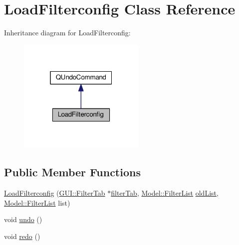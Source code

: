 \hypertarget{classUndoRedo_1_1LoadFilterconfig}{}\section{Load\+Filterconfig Class Reference}
\label{classUndoRedo_1_1LoadFilterconfig}


Inheritance diagram for Load\+Filterconfig\+:
\nopagebreak
\begin{figure}[H]
\begin{center}
\leavevmode
\includegraphics[width=172pt]{classUndoRedo_1_1LoadFilterconfig__inherit__graph}
\end{center}
\end{figure}
\subsection*{Public Member Functions}
\begin{DoxyCompactItemize}
\item 
\hyperlink{classUndoRedo_1_1LoadFilterconfig_a3bffa2e2bc6f8fc55e2e5c2615dad570}{Load\+Filterconfig} (\hyperlink{classGUI_1_1FilterTab}{G\+U\+I\+::\+Filter\+Tab} $\ast$\hyperlink{classUndoRedo_1_1LoadFilterconfig_a47ca82534a740774d79998759818d9f4}{filter\+Tab}, \hyperlink{classModel_1_1FilterList}{Model\+::\+Filter\+List} \hyperlink{classUndoRedo_1_1LoadFilterconfig_a6b2ec60707991d5154fcd5235ee89fe5}{old\+List}, \hyperlink{classModel_1_1FilterList}{Model\+::\+Filter\+List} list)
\item 
void \hyperlink{classUndoRedo_1_1LoadFilterconfig_a0e1e7804a53f6d62efc72c9bdbec8571}{undo} ()
\item 
void \hyperlink{classUndoRedo_1_1LoadFilterconfig_a93c48d6ed036e1a381be53ac67643284}{redo} ()
\end{DoxyCompactItemize}
